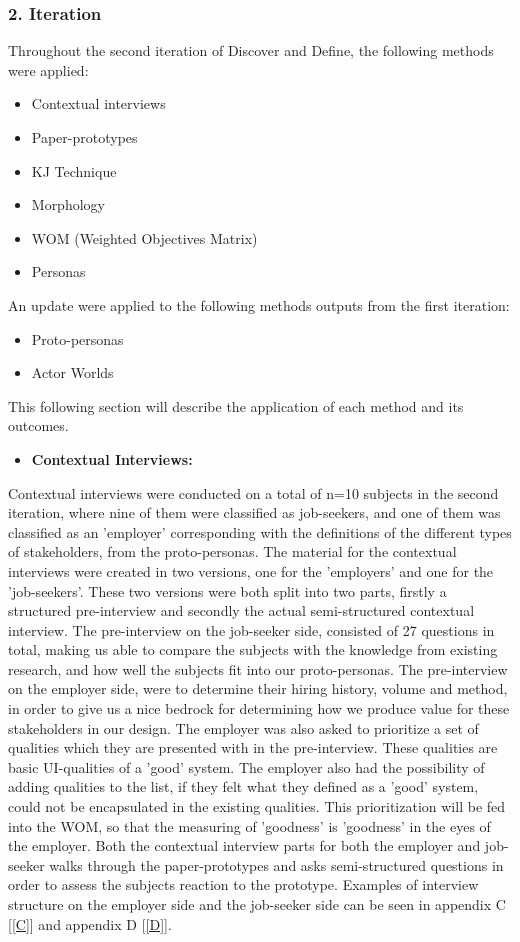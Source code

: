 \subsubsection{2. Iteration}

Throughout the second iteration of Discover and Define, the following methods were applied:
\begin{itemize}
    \item Contextual interviews
    \item Paper-prototypes
    \item KJ Technique
    \item Morphology
    \item WOM (Weighted Objectives Matrix)
    \item Personas
\end{itemize}
An update were applied to the following methods outputs from the first iteration:
\begin{itemize}
    \item Proto-personas
    \item Actor Worlds
\end{itemize}

This following section will describe the application of each method and its outcomes.

\begin{itemize}
    \item \bf{Contextual Interviews:}
\end{itemize}

Contextual interviews were conducted on a total of n=10 subjects in the second iteration, where nine of them were classified as job-seekers, and one of them was classified as an 'employer' corresponding with the definitions of the different types of stakeholders, from the proto-personas. The material for the contextual interviews were created in two versions, one for the 'employers' and one for the 'job-seekers'. These two versions were both split into two parts, firstly a structured pre-interview and secondly the actual semi-structured contextual interview. The pre-interview on the job-seeker side, consisted of 27 questions in total, making us able to compare the subjects with the knowledge from existing research, and how well the subjects fit into our proto-personas. The pre-interview on the employer side, were to determine their hiring history, volume and method, in order to give us a nice bedrock for determining how we produce value for these stakeholders in our design. The employer was also asked to prioritize a set of qualities which they are presented with in the pre-interview. These qualities are basic UI-qualities of a 'good' system. The employer also had the possibility of adding qualities to the list, if they felt what they defined as a 'good' system, could not be encapsulated in the existing qualities. This prioritization will be fed into the WOM, so that the measuring of 'goodness' is 'goodness' in the eyes of the employer. Both the contextual interview parts for both the employer and job-seeker walks through the paper-prototypes and asks semi-structured questions in order to assess the subjects reaction to the prototype. Examples of interview structure on the employer side and the job-seeker side can be seen in appendix C [\ref{C}] and appendix D [\ref{D}].

